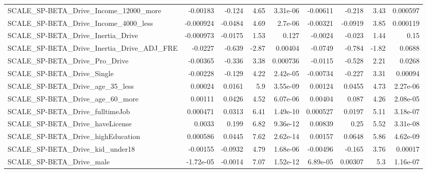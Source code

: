 \begin{tabular}{lrrrrrrrr}
SCALE\_SP-BETA\_Drive\_Income\_12000\_more              &    -0.00183 &       -0.124 &     4.65 & 3.31e-06 &   -0.00611 &      -0.218 &         3.43 &      0.000597 \\
SCALE\_SP-BETA\_Drive\_Income\_4000\_less               &   -0.000924 &      -0.0484 &     4.69 &  2.7e-06 &   -0.00321 &     -0.0919 &         3.85 &      0.000119 \\
SCALE\_SP-BETA\_Drive\_Inertia\_Drive                  &   -0.000973 &      -0.0175 &     1.53 &    0.127 &    -0.0024 &      -0.023 &         1.44 &          0.15 \\
SCALE\_SP-BETA\_Drive\_Inertia\_Drive\_ADJ\_FRE          &     -0.0227 &       -0.639 &    -2.87 &  0.00404 &    -0.0749 &      -0.784 &        -1.82 &        0.0688 \\
SCALE\_SP-BETA\_Drive\_Pro\_Drive                      &    -0.00365 &       -0.336 &     3.38 & 0.000736 &    -0.0115 &      -0.528 &         2.21 &        0.0268 \\
SCALE\_SP-BETA\_Drive\_Single                         &    -0.00228 &       -0.129 &     4.22 & 2.42e-05 &   -0.00734 &      -0.227 &         3.31 &       0.00094 \\
SCALE\_SP-BETA\_Drive\_age\_35\_less                    &     0.00024 &       0.0161 &      5.9 & 3.55e-09 &    0.00124 &      0.0455 &         4.73 &      2.27e-06 \\
SCALE\_SP-BETA\_Drive\_age\_60\_more                    &     0.00111 &       0.0426 &     4.52 & 6.07e-06 &    0.00404 &       0.087 &         4.26 &      2.08e-05 \\
SCALE\_SP-BETA\_Drive\_fulltimeJob                    &    0.000471 &       0.0313 &     6.41 & 1.49e-10 &   0.000527 &      0.0197 &         5.11 &      3.18e-07 \\
SCALE\_SP-BETA\_Drive\_haveLicense                    &      0.0033 &        0.199 &     6.82 & 9.36e-12 &    0.00839 &        0.25 &         5.52 &      3.31e-08 \\
SCALE\_SP-BETA\_Drive\_highEducation                  &    0.000586 &       0.0445 &     7.62 & 2.62e-14 &    0.00157 &      0.0648 &         5.86 &      4.62e-09 \\
SCALE\_SP-BETA\_Drive\_kid\_under18                    &    -0.00155 &      -0.0932 &     4.79 & 1.68e-06 &   -0.00496 &      -0.165 &         3.76 &       0.00017 \\
SCALE\_SP-BETA\_Drive\_male                           &   -1.72e-05 &      -0.0014 &     7.07 & 1.52e-12 &   6.89e-05 &     0.00307 &          5.3 &      1.16e-07 \\

\end{tabular}
